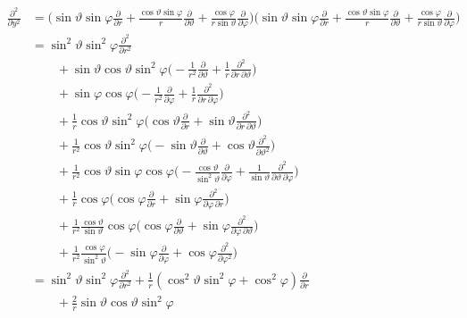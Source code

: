 \begin{align*}
\frac{\partial^2}{\partial y^2}
&=
\biggl(
\sin\vartheta\sin\varphi
\frac{\partial}{\partial r}
+
\frac{\cos\vartheta\sin\varphi}{r}
\frac{\partial}{\partial\vartheta}
+
\frac{\cos\varphi}{r\sin\vartheta}
\frac{\partial}{\partial\varphi}
\biggr)
\biggl(
\sin\vartheta\sin\varphi
\frac{\partial}{\partial r}
+
\frac{\cos\vartheta\sin\varphi}{r}
\frac{\partial}{\partial\vartheta}
+
\frac{\cos\varphi}{r\sin\vartheta}
\frac{\partial}{\partial\varphi}
\biggr)
\\
&=
\sin^2\vartheta \sin^2\varphi \frac{\partial^2}{\partial r^2}
\\
&\qquad
+\sin\vartheta\cos\vartheta\sin^2\varphi\biggl(
-\frac1{r^2}\frac{\partial}{\partial\vartheta}+\frac1r\frac{\partial^2}{\partial r\,\partial\vartheta}
\biggr)
\\
&\qquad
+\sin\varphi\cos\varphi\biggl(
-\frac1{r^2}\frac{\partial}{\partial\varphi}+\frac1r\frac{\partial^2}{\partial r\,\partial\varphi}
\biggr)
\\
&\qquad
+\frac1r\cos\vartheta\sin^2\varphi\biggl(
\cos\vartheta\frac{\partial}{\partial r}
+\sin\vartheta\frac{\partial^2}{\partial r\,\partial\vartheta}
\biggr)
\\
&\qquad
+\frac1{r^2} \cos\vartheta \sin^2\varphi \biggl(
-\sin\vartheta\frac{\partial}{\partial\vartheta}
+\cos\vartheta\frac{\partial^2}{\partial\vartheta^2}
\biggr)
\\
&\qquad
+\frac1{r^2}\cos\vartheta\sin\varphi\cos\varphi\biggl(
-\frac{\cos\vartheta}{\sin^2\vartheta}\frac{\partial}{\partial\varphi}
+\frac1{\sin\vartheta}\frac{\partial^2}{\partial\vartheta\,\partial\varphi}
\biggr)
\\
&\qquad
+\frac1r\cos\varphi\biggl(
\cos\varphi\frac{\partial}{\partial r}
+\sin\varphi\frac{\partial^2}{\partial\varphi\,\partial r}
\biggr)
\\
&\qquad
+\frac1{r^2}\frac{\cos\vartheta}{\sin\vartheta}\cos\varphi\biggl(
\cos\varphi\frac{\partial}{\partial\vartheta}
+\sin\varphi\frac{\partial^2}{\partial\varphi\,\partial\vartheta}
\biggr)
\\
&\qquad
+\frac1{r^2}\frac{\cos\varphi}{\sin^2\vartheta}\biggl(
-\sin\varphi\frac{\partial}{\partial\varphi}
+\cos\varphi\frac{\partial^2}{\partial\varphi^2}
\biggr)
\\
&=
\sin^2\vartheta\sin^2\varphi \frac{\partial^2}{\partial r^2}
+
\frac1r(\cos^2\vartheta\sin^2\varphi + \cos^2\varphi)\frac{\partial}{\partial r}
\\
&\qquad
+
\frac2r\sin\vartheta\cos\vartheta\sin^2\varphi

\end{align*}

